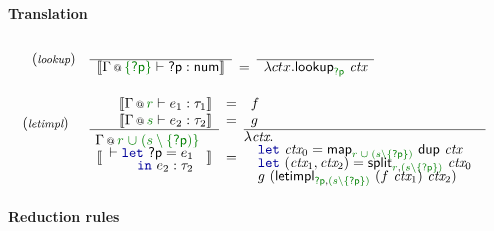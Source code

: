 \begin{figure}[h!]
\vspace{1em}
\paragraph{Translation}

\begin{equation*}
\begin{array}{rl}
(\footnotesize{\emph{lookup}}) &
\semdef
  { \coctx{\Gamma}{\cclrd{ \{\ident{?p}\} }} \vdash \ident{?p} : \ident{num} }
  {\lambda ctx.\ident{lookup}_{\cclrd{\ident{?p}}}~\ctx }
\\[2em]
\begin{array}{l}(\footnotesize{\emph{letimpl}})\\[1.25em]~\end{array}&
\semdefff
  { \coctx{\Gamma}{\cclrd{r}} \vdash e_1 : \tau_1}
  { \coctx{\Gamma}{\cclrd{s}} \vdash e_2 : \tau_2}
  {\hspace{-1em}\begin{array}{l}
      \coctx{\Gamma}{\cclrd{r} \;\cclrd{\cup\; (\cclrd{s} \setminus \{ \ident{?p}) \}} }\\[-0.3em]
        \quad \vdash \kvd{let}~\ident{?p}=e_1\\[-0.3em]
        \quad\qquad \kvd{in}~e_2 : \tau_2 \\[-0.3em]
        ~ \\[-0.3em]
   \end{array}}
  {f}
  {g}
  {\hspace{-1em}\begin{array}{l}
  \lambda\ctx.~~\\[-0.3em]
    \quad \kvd{let}~\ctx_0 = \ident{map}_{\cclrd{r} \;\cclrd{\cup}\; \cclrd{(s\setminus\{\ident{?p}\})}}~\ident{dup}~\ctx\\[-0.3em]
    \quad \kvd{let}~(\ctx_1, \ctx_2) = \ident{split}_{\cclrd{r}, \cclrd{(s\setminus\{\ident{?p}\})}}~\ctx_0\\[-0.3em]
    \quad g~(\ident{letimpl}_{\cclrd{\ident{?p}}, \cclrd{(s\setminus\{\ident{?p}\})}}~(f~\ctx_1)~\ctx_2)
  \end{array} }
\end{array}
\end{equation*}

\vspace{1em}
\paragraph{Reduction rules}


\end{figure}
